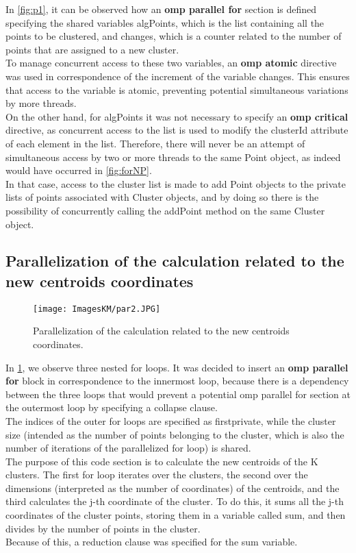 \documentclass[10pt,twocolumn,letterpaper]{article}
\begin{document}
In \cref{fig:p1}, it can be observed how an \textbf{omp parallel for} section is defined specifying the shared variables algPoints, which is the list containing all the points to be clustered, and changes, which is a counter related to the number of points that are assigned to a new cluster.\\
To manage concurrent access to these two variables, an \textbf{omp atomic} directive was used in correspondence of the increment of the variable changes. This ensures that access to the variable is atomic, preventing potential simultaneous variations by more threads.\\
On the other hand, for algPoints it was not necessary to specify an \textbf{omp critical} directive, as concurrent access to the list is used to modify the clusterId attribute of each element in the list. Therefore, there will never be an attempt of simultaneous access by two or more threads to the same Point object, as indeed would have occurred in \cref{fig:forNP}.\\
In that case, access to the cluster list is made to add Point objects to the private lists of points associated with Cluster objects, and by doing so there is the possibility of concurrently calling the addPoint method on the same Cluster object.

\subsection{Parallelization of the calculation related to the new centroids coordinates}

\begin{figure}[h]
    \centering
    \texttt{[image: ImagesKM/par2.JPG]}
    \caption{Parallelization of the calculation related to the new centroids coordinates.}
    \label{fig:p2}
\end{figure}

In \cref{fig:p2}, we observe three nested for loops. It was decided to insert an \textbf{omp parallel for} block in correspondence to the innermost loop, because there is a dependency between the three loops that would prevent a potential omp parallel for section at the outermost loop by specifying a collapse clause.\\
The indices of the outer for loops are specified as firstprivate, while the cluster size (intended as the number of points belonging to the cluster, which is also the number of iterations of the parallelized for loop) is shared.\\
The purpose of this code section is to calculate the new centroids of the K clusters. The first for loop iterates over the clusters, the second over the dimensions (interpreted as the number of coordinates) of the centroids, and the third calculates the j-th coordinate of the cluster. To do this, it sums all the j-th coordinates of the cluster points, storing them in a variable called sum, and then divides by the number of points in the cluster.\\
Because of this, a reduction clause was specified for the sum variable.
\end{document}
